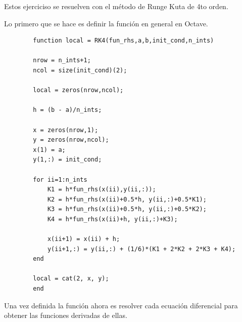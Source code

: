 \documentclass[a4paper, 12pt]{article}
\begin{document}
    Estos ejerciciso se resuelven con el método de Runge Kuta de 4to orden.

    Lo primero que se hace es definir la función en general en Octave.

    \begin{verbatim}
        function local = RK4(fun_rhs,a,b,init_cond,n_ints)
  
        nrow = n_ints+1;
        ncol = size(init_cond)(2);
        
        local = zeros(nrow,ncol);
        
        h = (b - a)/n_ints;
        
        x = zeros(nrow,1);
        y = zeros(nrow,ncol);
        x(1) = a;
        y(1,:) = init_cond;
        
        for ii=1:n_ints
            K1 = h*fun_rhs(x(ii),y(ii,:));
            K2 = h*fun_rhs(x(ii)+0.5*h, y(ii,:)+0.5*K1);
            K3 = h*fun_rhs(x(ii)+0.5*h, y(ii,:)+0.5*K2);
            K4 = h*fun_rhs(x(ii)+h, y(ii,:)+K3);
            
            x(ii+1) = x(ii) + h;
            y(ii+1,:) = y(ii,:) + (1/6)*(K1 + 2*K2 + 2*K3 + K4);
        end
        
        local = cat(2, x, y);
        end
    \end{verbatim}

    Una vez definida la función ahora es resolver cada ecuación diferencial para obtener las funciones derivadas de ellas.
\end{document}
